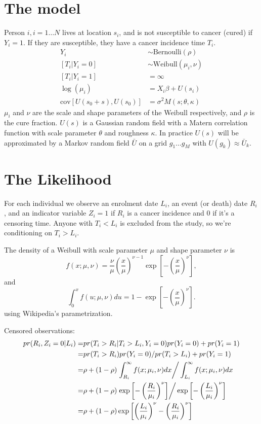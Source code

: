 \documentclass{article}
\begin{document}
\section{The model}
Person $i, i=1\ldots N$ lives at location $s_i$, and is not susceptible to cancer (cured) if $Y_i=1$.  If they are susceptible, they have a cancer incidence time $T_i$.
\begin{align*}
Y_i & \sim \text{Bernoulli}(\rho)\\
[T_i | Y_i = 0] &\sim \text{Weibull}(\mu_i, \nu)\\
[T_i | Y_i = 1] & = \infty \\
\log(\mu_i) &= X_i \beta + U(s_i)\\
\text{cov}[U(s_0 + s), U(s_0)] &= \sigma^2 M(s; \theta, \kappa) 
\end{align*}
$\mu_i$ and $\nu$ are the scale and shape parameters of the Weibull respectively, and $\rho$ is the cure fraction.  $U(s)$ is a Gaussian random field with a Matern correlation function with scale parameter $\theta$ and roughness $\kappa$.  In practice $U(s)$ will be approximated by a Markov random field $\bar U$ on a grid $g_1 \ldots g_M$ with $U(g_k) \approx \bar U_k$.

\section{The Likelihood}
For each individual we observe an enrolment date $L_i$, an event (or death) date $R_i$, and an indicator variable $Z_i = 1$ if $R_i$ is a cancer incidence and 0 if it's a censoring time. Anyone with $T_i < L_i$ is excluded from the study, so we're conditioning on $T_i > L_i$.  

The density of a Weibull with scale parameter $\mu$ and shape parameter $\nu$ is 
\[
f(x;\mu,\nu) = \frac{\nu}{\mu} \left(\frac{x}{\mu}\right)^{\nu-1} \exp\left[-\left(\frac{x}{\mu}\right)^\nu\right],
\]
and
\[
\int_0^x f(u;\mu,\nu)du = 1-\exp\left[-\left(\frac{x}{\mu}\right)^\nu\right].
\]
using Wikipedia's parametrization.

Censored observations:
\begin{align*}
pr(R_i, Z_i=0 | L_i) =& pr(T_i > R_i | T_i > L_i, Y_i =0) pr(Y_i =0)  + pr(Y_i =1)\\
=&pr(T_i > R_i) pr(Y_i = 0)/pr(T_i > L_i) + pr(Y_i =1)\\
=& \rho + (1-\rho) \left. \int_{R_i}^\infty f(x;\mu_i, \nu) dx \right/\int_{L_i}^\infty f(x;\mu_i, \nu) dx  \\
= &  \rho + (1-\rho) \left. \exp\left[-\left(\frac{R_i}{\mu_i}\right)^\nu\right] \right/\exp\left[-\left(\frac{L_i}{\mu_i}\right)^\nu\right]\\
= &  \rho + (1-\rho) \exp\left[\left(\frac{L_i}{\mu_i}\right)^\nu -\left(\frac{R_i}{\mu_i}\right)^\nu\right] \\
\end{align*}
\end{document}
